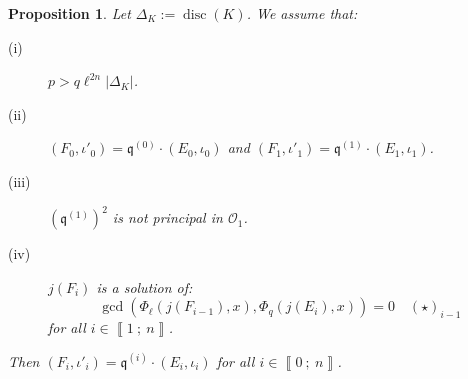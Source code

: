 \documentclass[a4paper,10pt,notitlepage]{report}
\theoremstyle{definition}
\theoremstyle{plain}
\newtheorem{Proposition}[Definition]{Proposition}
\theoremstyle{definition}
\newcommand{\mO}{\mathcal{O}}
\renewcommand{\i}[2]{\left\llbracket #1~;~#2\right\rrbracket}
\renewcommand{\(}{\left(}
\renewcommand{\)}{\right)}
\newcommand{\mf}[1]{\mathfrak{#1}}
\newcommand{\mfq}{\mathfrak{q}}
\DeclareMathOperator{\disc}{disc}
\begin{document}
\begin{Proposition}\label{Proposition 9}
Let $\Delta_K:=\disc(K)$. We assume that:
\begin{description}
\item[(i)] $p>q\ell^{2n}|\Delta_K|$.
\item[(ii)] $(F_0,\iota'_0)=\mf{q}^{(0)}\cdot(E_{0},\iota_0)$ and $(F_1,\iota'_1)=\mf{q}^{(1)}\cdot(E_{1},\iota_1)$.
\item[(iii)] $(\mfq^{(1)})^2$ is not principal in $\mO_1$.
\item[(iv)] $j(F_{i})$ is a solution of: 
\[\gcd(\Phi_\ell(j(F_{i-1}),x),\Phi_q(j(E_{i}),x))=0 \quad (\star)_{i-1}\] 
for all $i\in\i{1}{n}$. 
\end{description}
Then $(F_{i},\iota'_{i})=\mf{q}^{(i)}\cdot(E_{i},\iota_i)$ for all $i\in\i{0}{n}$.  
\end{Proposition}
\end{document}
